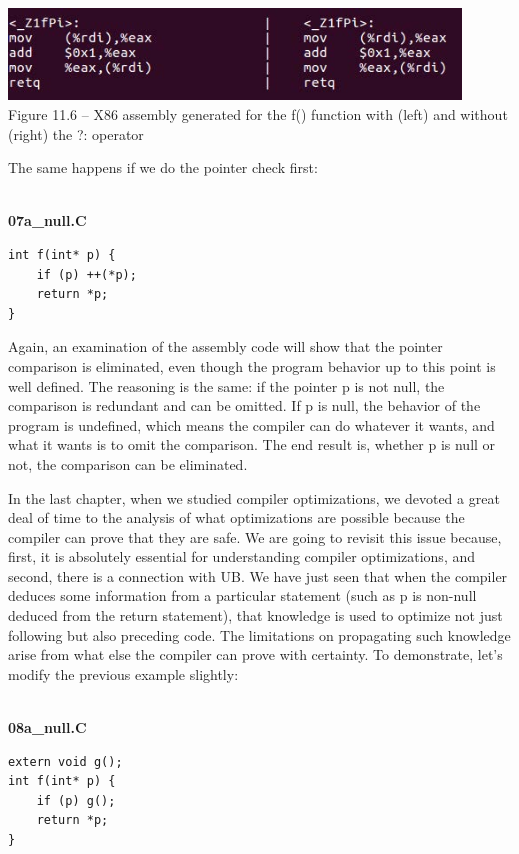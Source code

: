 \hspace*{\fill} \\ %
\begin{center}
\includegraphics[width=0.9\textwidth]{content/3/chapter11/images/6.jpg}\\
Figure 11.6 – X86 assembly generated for the f() function with (left) and without (right) the ?: operator
\end{center}

The same happens if we do the pointer check first:

\hspace*{\fill} \\ %
\noindent
\textbf{07a\_null.C}
\begin{lstlisting}[style=styleCXX]
int f(int* p) {
	if (p) ++(*p);
	return *p;
}
\end{lstlisting}

Again, an examination of the assembly code will show that the pointer comparison is eliminated, even though the program behavior up to this point is well defined. The reasoning is the same: if the pointer p is not null, the comparison is redundant and can be omitted. If p is null, the behavior of the program is undefined, which means the compiler can do whatever it wants, and what it wants is to omit the comparison. The end result is, whether p is null or not, the comparison can be eliminated.

In the last chapter, when we studied compiler optimizations, we devoted a great deal of time to the analysis of what optimizations are possible because the compiler can prove that they are safe. We are going to revisit this issue because, first, it is absolutely essential for understanding compiler optimizations, and second, there is a connection with UB. We have just seen that when the compiler deduces some information from a particular statement (such as p is non-null deduced from the return statement), that knowledge is used to optimize not just following but also preceding code. The limitations on propagating such knowledge arise from what else the compiler can prove with certainty. To demonstrate, let's modify the previous example slightly:

\hspace*{\fill} \\ %
\noindent
\textbf{08a\_null.C}
\begin{lstlisting}[style=styleCXX]
extern void g();
int f(int* p) {
	if (p) g();
	return *p;
}
\end{lstlisting}


